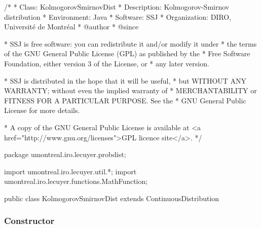 \begin{code}
\begin{hide}
/*
 * Class:        KolmogorovSmirnovDist
 * Description:  Kolmogorov-Smirnov distribution
 * Environment:  Java
 * Software:     SSJ
 * Organization: DIRO, Université de Montréal
 * @author
 * @since

 * SSJ is free software: you can redistribute it and/or modify it under
 * the terms of the GNU General Public License (GPL) as published by the
 * Free Software Foundation, either version 3 of the License, or
 * any later version.

 * SSJ is distributed in the hope that it will be useful,
 * but WITHOUT ANY WARRANTY; without even the implied warranty of
 * MERCHANTABILITY or FITNESS FOR A PARTICULAR PURPOSE.  See the
 * GNU General Public License for more details.

 * A copy of the GNU General Public License is available at
   <a href="http://www.gnu.org/licenses">GPL licence site</a>.
 */
\end{hide}
package umontreal.iro.lecuyer.probdist;
\begin{hide}
import umontreal.iro.lecuyer.util.*;
import umontreal.iro.lecuyer.functions.MathFunction;
\end{hide}

public class KolmogorovSmirnovDist extends ContinuousDistribution\begin{hide} {
   protected int n;
   protected static final int NEXACT = 500;

   // For the Durbin matrix algorithm
   private static final double NORM = 1.0e140;
   private static final double INORM = 1.0e-140;
   private static final int LOGNORM = 140;



   //========================================================================

   private static class Function implements MathFunction {
      protected int n;
      protected double u;

      public Function (int n, double u) {
         this.n = n;
         this.u = u;
      }

      public double evaluate (double x) {
         return u - cdf(n,x);
      }
   }
\end{hide}
\end{code}
\subsubsection* {Constructor}

